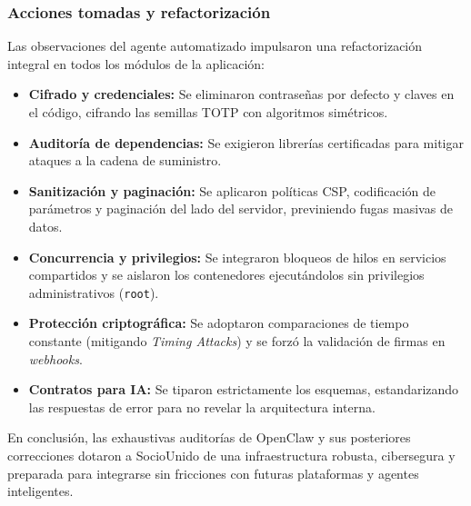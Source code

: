 \subsubsection{Acciones tomadas y refactorización}

Las observaciones del agente automatizado impulsaron una refactorización integral en todos los módulos de la aplicación:

\begin{itemize}
    \item \textbf{Cifrado y credenciales:} Se eliminaron contraseñas por defecto y claves en el código, cifrando las semillas TOTP con algoritmos simétricos.
    \item \textbf{Auditoría de dependencias:} Se exigieron librerías certificadas para mitigar ataques a la cadena de suministro.
    \item \textbf{Sanitización y paginación:} Se aplicaron políticas CSP, codificación de parámetros y paginación del lado del servidor, previniendo fugas masivas de datos.
    \item \textbf{Concurrencia y privilegios:} Se integraron bloqueos de hilos en servicios compartidos y se aislaron los contenedores ejecutándolos sin privilegios administrativos (\texttt{root}).
    \item \textbf{Protección criptográfica:} Se adoptaron comparaciones de tiempo constante (mitigando \textit{Timing Attacks}) y se forzó la validación de firmas en \textit{webhooks}.
    \item \textbf{Contratos para IA:} Se tiparon estrictamente los esquemas, estandarizando las respuestas de error para no revelar la arquitectura interna.
\end{itemize}

En conclusión, las exhaustivas auditorías de OpenClaw y sus posteriores correcciones dotaron a SocioUnido de una infraestructura robusta, cibersegura y preparada para integrarse sin fricciones con futuras plataformas y agentes inteligentes.
